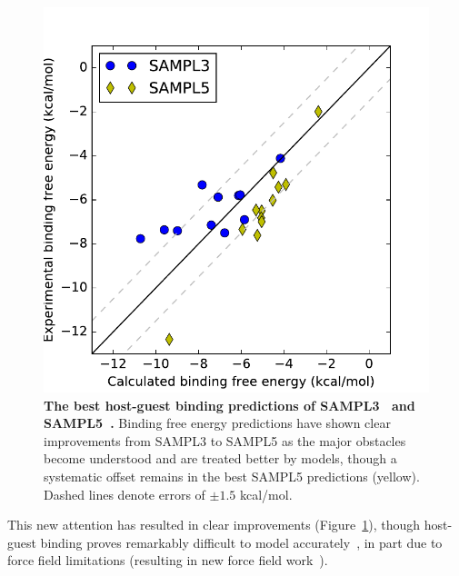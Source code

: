 \documentclass[11pt]{article}
\begin{document}
\begin{figure}
\vspace{-0.23in}
\begin{centering}
\includegraphics[width=\textwidth]{figures/sampl3_and_sampl5.pdf}

\end{centering}
\footnotesize
\caption{\label{figure:hg_sampl}  
\textbf{The best host-guest binding predictions of SAMPL3~\cite{muddana_sampl3_2012} and SAMPL5~\cite{yin_sampl5_2016}.} 
Binding free energy predictions have shown clear improvements from SAMPL3 to SAMPL5 as the major obstacles become understood and are treated better by models, though a systematic offset remains in the best SAMPL5 predictions (yellow). Dashed lines denote errors of $\pm1.5$ kcal/mol.
}
\end{figure}

This new attention has resulted in clear improvements (Figure~\ref{figure:hg_sampl}), though host-guest binding proves remarkably difficult to model accurately~\cite{henriksen_computational_2015}, in part due to force field limitations (resulting in new force field work~\cite{yin_toward_2015}).
\end{document}
